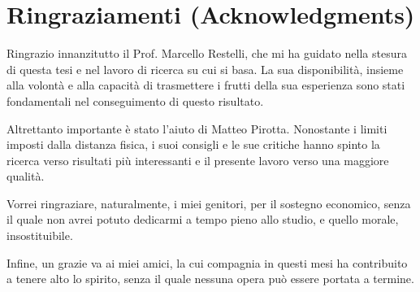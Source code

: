 
\bigskip

\begingroup
\let\clearpage\relax
\let\cleardoublepage\relax
\let\cleardoublepage\relax
\chapter*{Ringraziamenti (Acknowledgments)}

Ringrazio innanzitutto il Prof. Marcello Restelli, che mi ha guidato nella stesura di questa tesi e nel lavoro di ricerca su cui si basa. La sua disponibilità, insieme alla volontà e alla capacità di trasmettere i frutti della sua esperienza sono stati fondamentali nel conseguimento di questo risultato.

Altrettanto importante è stato l'aiuto di Matteo Pirotta. Nonostante i limiti imposti dalla distanza fisica, i suoi consigli e le sue critiche hanno spinto la ricerca verso risultati più interessanti e il presente lavoro verso una maggiore qualità.

Vorrei ringraziare, naturalmente, i miei genitori, per il sostegno economico, senza il quale non avrei potuto dedicarmi a tempo pieno allo studio, e quello morale, insostituibile.

Infine, un grazie va ai miei amici, la cui compagnia in questi mesi ha contribuito a tenere alto lo spirito, senza il quale nessuna opera può essere portata a termine.
\endgroup